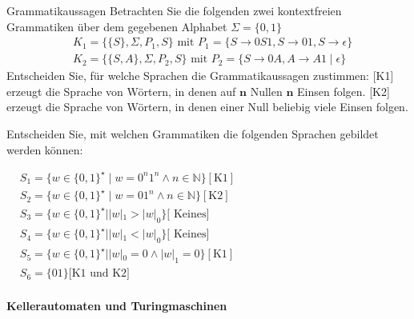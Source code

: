 \begin{example2}{Grammatikaussagen}
    Betrachten Sie die folgenden zwei kontextfreien Grammatiken über dem gegebenen Alphabet $\Sigma=\{0,1\}$
$$
\begin{aligned}
& K_1=\{\{S\}, \Sigma, P_1, S\} \text { mit } P_1=\{S \rightarrow 0 S 1, S \rightarrow 01, S \rightarrow \epsilon\} \\
& K_2=\{\{S, A\}, \Sigma, P_2, S\} \text { mit } P_2=\{S \rightarrow 0 A, A \rightarrow A 1 \mid \epsilon\}
\end{aligned}
$$
Entscheiden Sie, für welche Sprachen die Grammatikaussagen zustimmen:
[K1] erzeugt die Sprache von Wörtern, in denen auf $\boldsymbol{n}$ Nullen $\boldsymbol{n}$ Einsen folgen.
[K2] erzeugt die Sprache von Wörtern, in denen einer Null beliebig viele Einsen folgen.

Entscheiden Sie, mit welchen Grammatiken die folgenden Sprachen gebildet werden können:

$
\begin{aligned}
& S_1=\{w \in\{0,1\}^{\star} \mid w=0^n 1^n \wedge n \in \mathbb{N}\}[\mathrm{K} 1] \\
& S_2=\{w \in\{0,1\}^{\star} \mid w=01^n \wedge n \in \mathbb{N}\}[\mathrm{K} 2] \\
& S_3=\{w \in\{0,1\}^{\star}|| w|_1>|w|_0\}[\text { Keines] } \\
& S_4=\{w \in\{0,1\}^{\star}|| w|_1<|w|_0\}[\text { Keines] } \\
& S_5=\{w \in\{0,1\}^{\star}|| w|_0=0 \wedge|w|_1=0\}[\mathrm{K} 1] \\
& S_6=\{01\}[\mathrm{K} 1 \text { und K2] }
\end{aligned}
$
\end{example2}

\paragraph{Kellerautomaten und Turingmaschinen}

